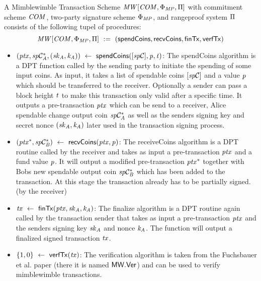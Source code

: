 \begin{definition}
    \label{def:atom:mw-tx-scheme}
    A Mimblewimble Transaction Scheme $\mathit{MW}[\mathit{COM},\Phi_{\mathit{MP}},\Pi]$ with commitment scheme $\mathit{COM}$, two-party signature scheme $\Phi_{\mathit{MP}}$, and rangeproof system $\Pi$ consists of the following tupel of procedures:
    \[ \mathit{MW}[\mathit{COM},\Phi_{\mathit{MP}},\Pi] ~:=~ ( \mathsf{spendCoins},\mathsf{recvCoins},\mathsf{finTx},\mathsf{verfTx} ) \]
    \begin{itemize}
        \item $(\mathit{ptx}, \mathit{sp}\mathcal{C}_{\mathit{A}}^*, (\mathit{sk}_{\mathit{A}}, \mathit{\mathit{k}_{\mathit{A}}})) ~\leftarrow~ \mathsf{spendCoins}([\mathit{sp}\mathcal{C}],\mathit{p},\mathit{t})$: The spendCoins algorithm is a DPT function called by the sending party to initiate the spending of some input coins.
        As input, it takes a list of spendable coins $[\mathit{sp}\mathcal{C}]$ and a value $\mathit{p}$ which should be transferred to the receiver.
        Optionally a sender can pass a block height $\mathit{t}$ to make this transaction only valid after a specific time.
        It outputs a pre-transaction $\mathit{ptx}$ which can be send to a receiver, Alice spendable change output coin $\mathit{sp}\mathcal{C}_{\mathit{A}}^*$ as well as the senders signing key and secret nonce $(\mathit{sk}_{\mathit{A}}, \mathit{\mathit{k}_{\mathit{A}}})$ later used in the transaction signing process.
        \item $(\mathit{ptx}^*, \mathit{sp}\mathcal{C}_{\mathit{B}}^*) ~\leftarrow~ \mathsf{recvCoins}(\mathit{ptx},\mathit{p})$: The receiveCoins algorithm is a DPT routine called by the receiver and takes as input a pre-transaction $\mathit{ptx}$ and a fund value
        $\mathit{p}$.
        It will output a modified pre-transaction $\mathit{ptx}^*$ together with Bobs new spendable output coin $\mathit{sp}\mathcal{C}_{\mathit{B}}^*$ which has been added to the transaction.
        At this stage the transaction already has to be partially signed. (by the receiver)
        \item $\mathit{tx} ~\leftarrow~ \mathsf{finTx}(\mathit{ptx},\mathit{sk}_{\mathit{A}},\mathit{\mathit{k}_{\mathit{A}}})$: The finalize algorithm is a DPT routine again called by the transaction sender that takes as input a pre-transaction $\mathit{ptx}$ and the senders signing key $\mathit{sk}_{\mathit{A}}$ and nonce $\mathit{\mathit{k}_{\mathit{A}}}$.
        The function will output a finalized signed transaction $\mathit{tx}$.
        \item $\{1,0\} ~\leftarrow~ \mathsf{verfTx}(\mathit{tx})$: The verification algorithm is taken from the Fuchsbauer et al. paper \cite{fuchsbauer2019aggregate} (there it is named $\mathsf{MW.Ver}$) and can be used to verify mimblewimble transactions.

\end{itemize}
\end{definition}
